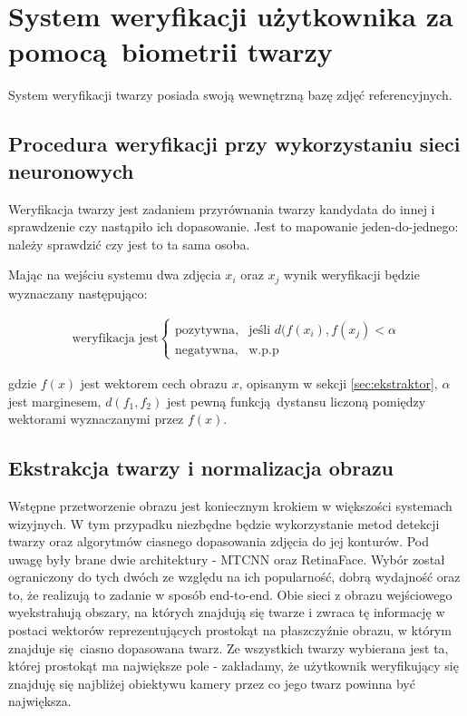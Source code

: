 

\section[verification]{System weryfikacji użytkownika za pomocą biometrii twarzy}\label{sec:verification}

System weryfikacji twarzy posiada swoją wewnętrzną bazę
zdjęć referencyjnych.

\subsection{Procedura weryfikacji przy wykorzystaniu sieci neuronowych} 

Weryfikacja twarzy jest zadaniem przyrównania twarzy kandydata 
do innej i sprawdzenie czy nastąpiło ich dopasowanie. Jest to mapowanie
jeden-do-jednego: należy sprawdzić czy jest to ta sama osoba.

Mając na wejściu systemu dwa zdjęcia \(x_i\) oraz \(x_j\) wynik weryfikacji będzie wyznaczany następująco:

\begin{align}\label{eq:ekstraktor_weryfikacja}
\text{weryfikacja jest}\begin{cases}
    \text{pozytywna},& \text{jeśli } d(f(x_i), f(x_j) < \alpha \\
    \text{negatywna},              & \text{w.p.p}
\end{cases}
\end{align}

gdzie \(f(x)\) jest wektorem cech obrazu \(x\), opisanym w sekcji
\ref{sec:ekstraktor}, \(\alpha\) jest marginesem, \(d(f_1, f_2)\) jest pewną funkcją dystansu liczoną pomiędzy wektorami wyznaczanymi przez \(f(x)\).

\subsection{Ekstrakcja twarzy i normalizacja obrazu}
Wstępne przetworzenie obrazu jest koniecznym krokiem w większości systemach wizyjnych. W tym
przypadku niezbędne będzie wykorzystanie metod detekcji twarzy oraz algorytmów ciasnego
dopasowania zdjęcia do jej konturów. Pod uwagę były brane dwie architektury - MTCNN oraz
RetinaFace. Wybór został ograniczony do tych dwóch ze względu na ich popularność, dobrą wydajność
oraz to, że realizują to zadanie w sposób end-to-end. Obie sieci z obrazu wejściowego
wyekstrahują obszary, na których znajdują się twarze i zwraca tę informację w postaci wektorów reprezentujących prostokąt na płaszczyźnie obrazu, w którym znajduje się ciasno dopasowana twarz. Ze wszystkich twarzy wybierana jest ta, której prostokąt ma największe pole - zakładamy, że użytkownik weryfikujący się znajduję się najbliżej obiektywu kamery przez co jego twarz powinna być największa.

